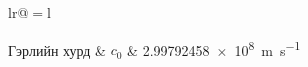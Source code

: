 \addchaptertocentry{\constantsname}

\begin{constants}{lr@{${}={}$}l} %


	Гэрлийн хурд & $c_{0}$ & \SI{2.99792458e8}{\meter\per\second} \\

\end{constants}
